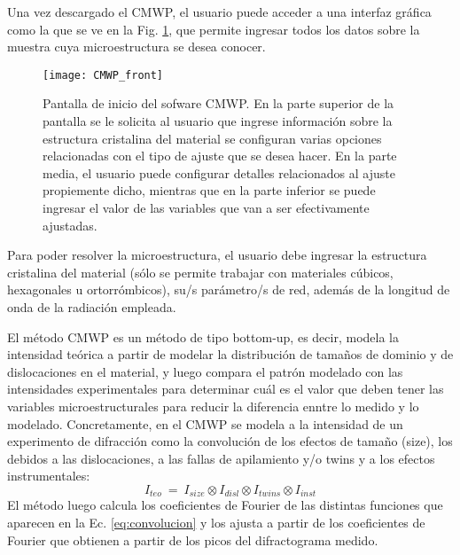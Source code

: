 Una vez descargado el CMWP, el usuario puede acceder a una interfaz gráfica como la que se ve en la Fig. \ref{fig:CMWP_front}, que permite ingresar todos los datos sobre la muestra cuya microestructura se desea conocer.
\begin{figure}[!htb]
  \centering
  \texttt{[image: CMWP\_front]}
  \caption{Pantalla de inicio del sofware CMWP. En la parte superior de la pantalla se le solicita al usuario que ingrese información sobre la estructura cristalina del material se configuran varias opciones relacionadas con el tipo de ajuste que se desea hacer. En la parte media, el usuario puede configurar detalles relacionados al ajuste propiemente dicho, mientras que en la parte inferior se puede ingresar el valor de las variables que van a ser efectivamente ajustadas.}
  \label{fig:CMWP_front}
\end{figure}

Para poder resolver la microestructura, el usuario debe ingresar la estructura cristalina del material (sólo se permite trabajar con materiales cúbicos, hexagonales u ortorrómbicos), su/s parámetro/s de red, además de la longitud de onda de la radiación empleada.

El método CMWP es un método de tipo bottom-up, es decir, modela la intensidad teórica a partir de modelar la distribución de tamaños de dominio y de dislocaciones en el material, y luego compara el patrón modelado con las intensidades experimentales para determinar cuál es el valor que deben tener las variables microestructurales para reducir la diferencia enntre lo medido y lo modelado.
Concretamente, en el CMWP se modela a la intensidad de un experimento de difracción como la convolución de los efectos de tamaño (size), los debidos a las dislocaciones, a las fallas de apilamiento y/o twins y a los efectos instrumentales:
\begin{equation}
  I_{teo} \ = \ I_{size} \otimes I_{disl} \otimes I_{twins} \otimes I_{inst}
  \label{eq:convolucion}
\end{equation}
\noindent
El método luego calcula los coeficientes de Fourier de las distintas funciones que aparecen en la Ec. \ref{eq:convolucion} y los ajusta a partir de los coeficientes de Fourier que obtienen a partir de los picos del difractograma medido.


